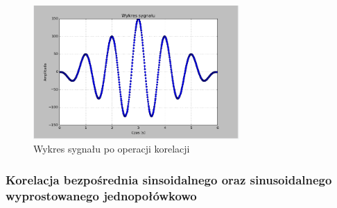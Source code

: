 \documentclass{article}
\begin{document}
{{        \begin{figure}[h!]
            \centering
            \includegraphics[width=0.7\textwidth]{img/kor_bez_1.png}
            \caption{Wykres sygnału po operacji korelacji}
        \end{figure}
        \FloatBarrier
    }
    \FloatBarrier
\subsubsection{Korelacja bezpośrednia sinsoidalnego oraz sinusoidalnego wyprostowanego
    jednopołówkowo} \label{eksperyment:korelacja2}{

}}
\end{document}
